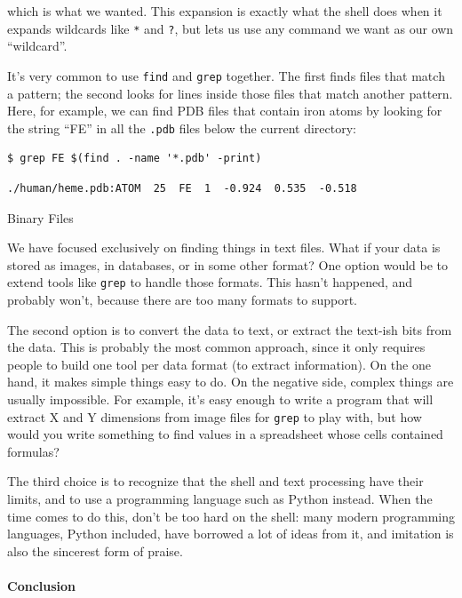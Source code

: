 \documentclass{book}
\begin{document}
which is what we wanted. This expansion is exactly what the shell does
when it expands wildcards like \texttt{*} and \texttt{?}, but lets us
use any command we want as our own ``wildcard''.

It's very common to use \texttt{find} and \texttt{grep} together. The
first finds files that match a pattern; the second looks for lines
inside those files that match another pattern. Here, for example, we can
find PDB files that contain iron atoms by looking for the string ``FE''
in all the \texttt{.pdb} files below the current directory:

\begin{verbatim}
$ grep FE $(find . -name '*.pdb' -print)
\end{verbatim}

\begin{verbatim}
./human/heme.pdb:ATOM  25  FE  1  -0.924  0.535  -0.518
\end{verbatim}

\begin{swcbox}{Binary Files}

We have focused exclusively on finding things in text files. What if
your data is stored as images, in databases, or in some other format?
One option would be to extend tools like \texttt{grep} to handle those
formats. This hasn't happened, and probably won't, because there are too
many formats to support.

The second option is to convert the data to text, or extract the
text-ish bits from the data. This is probably the most common approach,
since it only requires people to build one tool per data format (to
extract information). On the one hand, it makes simple things easy to
do. On the negative side, complex things are usually impossible. For
example, it's easy enough to write a program that will extract X and Y
dimensions from image files for \texttt{grep} to play with, but how
would you write something to find values in a spreadsheet whose cells
contained formulas?

The third choice is to recognize that the shell and text processing have
their limits, and to use a programming language such as Python instead.
When the time comes to do this, don't be too hard on the shell: many
modern programming languages, Python included, have borrowed a lot of
ideas from it, and imitation is also the sincerest form of praise.

\end{swcbox}

\mbox{}\paragraph{Conclusion}
\end{document}
